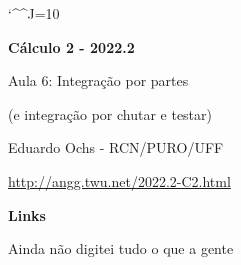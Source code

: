 \documentclass[oneside,12pt]{article}
\begin{document}
\catcode`\^^J=10
\pu
\def\pictgridstyle{\color{GrayPale}\linethickness{0.3pt}}
\def\pictaxesstyle{\linethickness{0.5pt}}
\def\pictnaxesstyle{\color{GrayPale}\linethickness{0.5pt}}
\celllower=2.5pt


\def\u#1{\par{\footnotesize \url{#1}}}

\def\drafturl{http://angg.twu.net/LATEX/2022-2-C2.pdf}
\def\drafturl{http://angg.twu.net/2022.2-C2.html}
\def\draftfooter{\tiny \href{\drafturl}{\jobname{}} \ColorBrown{\shorttoday{} \hours}}

\def\Rq{\ColorRed{?}}
\def\qeq{\overset{\Rq}{=}}




%

\thispagestyle{empty}

\begin{center}

\vspace*{1.2cm}

{\bf \Large Cálculo 2 - 2022.2}

\bsk

Aula 6: Integração por partes

(e integração por chutar e testar)

\bsk

Eduardo Ochs - RCN/PURO/UFF

\url{http://angg.twu.net/2022.2-C2.html}

\end{center}

\newpage

{\bf Links}

Ainda não digitei tudo o que a gente
\end{document}
